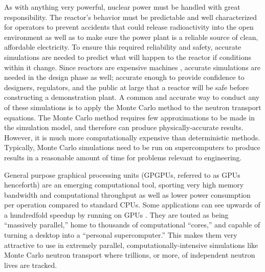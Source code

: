 As with anything very powerful, nuclear power must be handled with great responsibility.  The reactor's behavior must be predictable and well characterized for operators to prevent accidents that could release radioactivity into the open environment as well as to make sure the power plant is a reliable source of clean, affordable electricity.  To ensure this required reliability and safety, accurate simulations are needed to predict what will happen to the reactor if conditions within it change.  Since reactors are  expensive machines \cite{}, accurate simulations are needed in the design phase as well; accurate enough to provide confidence to designers, regulators, and the public at large that a reactor will be safe before constructing a demonstration plant.  A common and accurate way to conduct any of these simulations is to apply the Monte Carlo method to the neutron transport equations.  The Monte Carlo method requires few approximations to be made in the simulation model, and therefore can produce  physically-accurate results.  However, it is much more computationally expensive than deterministic methods.  Typically, Monte Carlo simulations need to be run on supercomputers to produce results in a reasonable amount of time for problems relevant to engineering.

General purpose graphical processing units (GPGPUs, referred to as GPUs henceforth) are an emerging computational tool, sporting very high memory bandwidth and computational throughput as well as lower power consumption per operation compared to standard CPUs.  Some applications can see upwards of a hundredfold speedup by running on GPUs \cite{}.  They are touted as being ``massively parallel,'' home to thousands of computational ``cores,'' and capable of turning a desktop into a ``personal supercomputer.''  This makes them very attractive to use in extremely parallel, computationally-intensive simulations like Monte Carlo neutron transport where trillions, or more, of independent neutron lives are tracked.   

